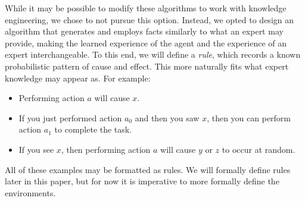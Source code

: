 \documentclass[letterpaper]{article} %
\begin{document}
While it may be possible to modify these algorithms to work with knowledge engineering, we chose to not pursue this option. Instead, we opted to design an algorithm that generates and employs facts similarly to what an expert may provide, making the learned experience of the agent and the experience of an expert interchangeable. To this end, we will define a \textit{rule}, which records a known probabilistic pattern of cause and effect. This more naturally fits what expert knowledge may appear as. For example:
\begin{itemize}
	\item Performing action $a$ will cause $x$.
	\item If you just performed action $a_0$ and then you saw $x$, then you can perform action $a_1$ to complete the task.
	\item If you see $x$, then performing action $a$ will cause $y$ or $z$ to occur at random.
\end{itemize}
All of these examples may be formatted as rules. We will formally define rules later in this paper, but for now it is imperative to more formally define the environments.







\end{document}
